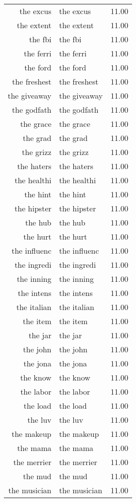 \begin{table}[ht]
\begin{tabular}{rlr}
  the excus & the excus & 11.00 \\ 
  the extent & the extent & 11.00 \\ 
  the fbi & the fbi & 11.00 \\ 
  the ferri & the ferri & 11.00 \\ 
  the ford & the ford & 11.00 \\ 
  the freshest & the freshest & 11.00 \\ 
  the giveaway & the giveaway & 11.00 \\ 
  the godfath & the godfath & 11.00 \\ 
  the grace & the grace & 11.00 \\ 
  the grad & the grad & 11.00 \\ 
  the grizz & the grizz & 11.00 \\ 
  the haters & the haters & 11.00 \\ 
  the healthi & the healthi & 11.00 \\ 
  the hint & the hint & 11.00 \\ 
  the hipster & the hipster & 11.00 \\ 
  the hub & the hub & 11.00 \\ 
  the hurt & the hurt & 11.00 \\ 
  the influenc & the influenc & 11.00 \\ 
  the ingredi & the ingredi & 11.00 \\ 
  the inning & the inning & 11.00 \\ 
  the intens & the intens & 11.00 \\ 
  the italian & the italian & 11.00 \\ 
  the item & the item & 11.00 \\ 
  the jar & the jar & 11.00 \\ 
  the john & the john & 11.00 \\ 
  the jona & the jona & 11.00 \\ 
  the know & the know & 11.00 \\ 
  the labor & the labor & 11.00 \\ 
  the load & the load & 11.00 \\ 
  the luv & the luv & 11.00 \\ 
  the makeup & the makeup & 11.00 \\ 
  the mama & the mama & 11.00 \\ 
  the merrier & the merrier & 11.00 \\ 
  the mud & the mud & 11.00 \\ 
  the musician & the musician & 11.00 \\ 

\end{tabular}
\end{table}
